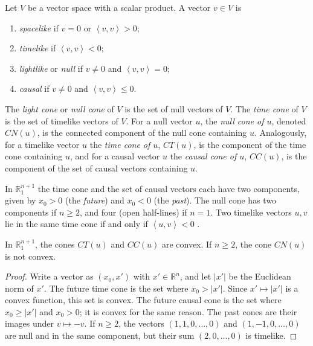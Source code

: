 \begin{definition}
\label{definition-palmas-causal-character}
Let $V$ be a vector space with a scalar
product. A vector $v\in V$ is
\begin{enumerate}
\item \emph{spacelike} if $v=0$ or
$\left\langle{} v,v \right\rangle{}>0$;
\item \emph{timelike} if
$\left\langle{} v,v \right\rangle{}<0$;
\item \emph{lightlike} or \emph{null} if
$v\neq 0$ and
$\left\langle{} v,v \right\rangle{}=0$;
\item \emph{causal} if $v\neq 0$ and
$\left\langle{} v,v \right\rangle{}\leq 0$.
\end{enumerate}
The \emph{light cone} or \emph{null cone}
of $V$ is the set of null vectors of $V$.
The \emph{time cone} of $V$ is the set of
timelike vectors of $V$. For a null vector
$u$, the \emph{null cone of $u$},
denoted $CN(u)$, is the connected component
of the null cone containing $u$.
Analogously, for a timelike vector $u$ the
\emph{time cone of $u$}, $CT(u)$, is the
component of the time cone containing $u$,
and for a causal vector $u$ the
\emph{causal cone of $u$}, $CC(u)$, is the
component of the set of causal vectors
containing $u$.
\end{definition}

In $\mathbb{R}^{n+1}_1$ the time cone and
the set of causal vectors each have two
components, given by $x_0>0$ (the
\emph{future}) and $x_0<0$ (the
\emph{past}). The null cone has two
components if $n\geq 2$, and four (open
half-lines) if $n=1$. Two timelike vectors
$u,v$ lie in the same time cone if and
only if
$\left\langle{} u,v \right\rangle{}<0$
\cite[Section 1.2]{lopez2014differential}.

\begin{proposition}
\label{proposition-palmas-cones-convex}
In $\mathbb{R}^{n+1}_1$, the cones $CT(u)$
and $CC(u)$ are convex. If $n\geq 2$, the
cone $CN(u)$ is not convex.
\end{proposition}

\begin{proof}
Write a vector as $(x_0,x')$ with
$x'\in\mathbb{R}^n$, and let $|x'|$ be the
Euclidean norm of $x'$. The future time
cone is the set where $x_0>|x'|$. Since
$x'\mapsto |x'|$ is a convex function, this
set is convex. The future causal cone is the
set where $x_0\geq |x'|$ and $x_0>0$; it is
convex for the same reason. The past cones
are their images under $v\mapsto -v$.
If $n\geq 2$, the vectors $(1,1,0,\dots,0)$
and $(1,-1,0,\dots,0)$ are null and in the
same component, but their sum
$(2,0,\dots,0)$ is timelike.
\end{proof}

